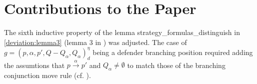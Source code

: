 \section{Contributions to the Paper}
The sixth inductive property of the lemma strategy\_formulas\_distinguish in \ref{deviation:lemma3} (lemma 3 in \cite{bisping2023lineartimebranchingtime}) was adjusted. The case of $g=(p,\alpha ,p', Q- Q_\alpha, Q_\alpha)_d^\eta$ being a defender branching position required adding the assumtions that $p \overset{\alpha}{\longrightarrow} p'$ and $Q_\alpha \neq \emptyset$ to match those of the branching conjunction move rule (cf. \cite[p. 13]{bisping2023lineartimebranchingtime}). 